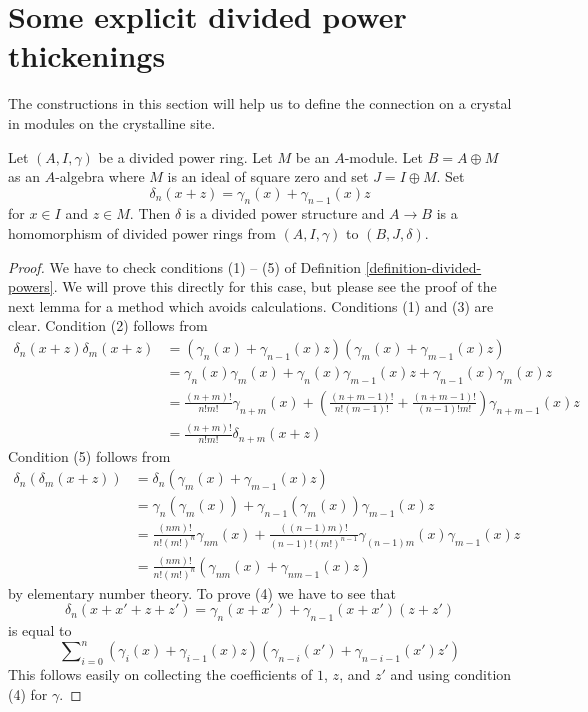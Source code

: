 \section{Some explicit divided power thickenings}
\label{section-explicit-thickenings}

\noindent
The constructions in this section will help us to define the connection
on a crystal in modules on the crystalline site.

\begin{lemma}
\label{lemma-divided-power-first-order-thickening}
Let $(A, I, \gamma)$ be a divided power ring. Let $M$ be an $A$-module.
Let $B = A \oplus M$ as an $A$-algebra where $M$ is an ideal of square zero
and set $J = I \oplus M$. Set
$$
\delta_n(x + z) = \gamma_n(x) + \gamma_{n - 1}(x)z
$$
for $x \in I$ and $z \in M$.
Then $\delta$ is a divided power structure and
$A \to B$ is a homomorphism of divided power rings from
$(A, I, \gamma)$ to $(B, J, \delta)$.
\end{lemma}

\begin{proof}
We have to check conditions (1) -- (5) of
Definition \ref{definition-divided-powers}.
We will prove this directly for this case, but please see the proof of
the next lemma for a method which avoids calculations.
Conditions (1) and (3) are clear. Condition (2) follows from
\begin{align*}
\delta_n(x + z)\delta_m(x + z)
& =
(\gamma_n(x) + \gamma_{n - 1}(x)z)(\gamma_m(x) + \gamma_{m - 1}(x)z) \\
& = \gamma_n(x)\gamma_m(x) + \gamma_n(x)\gamma_{m - 1}(x)z +
\gamma_{n - 1}(x)\gamma_m(x)z \\
& =
\frac{(n + m)!}{n!m!} \gamma_{n + m}(x) +
\left(\frac{(n + m - 1)!}{n!(m - 1)!} +
\frac{(n + m - 1)!}{(n - 1)!m!}\right)
\gamma_{n + m - 1}(x) z \\
& =
\frac{(n + m)!}{n!m!}\delta_{n + m}(x + z)
\end{align*}
Condition (5) follows from
\begin{align*}
\delta_n(\delta_m(x + z))
& =
\delta_n(\gamma_m(x) + \gamma_{m - 1}(x)z) \\
& =
\gamma_n(\gamma_m(x)) + \gamma_{n - 1}(\gamma_m(x))\gamma_{m - 1}(x)z \\
& =
\frac{(nm)!}{n! (m!)^n} \gamma_{nm}(x) +
\frac{((n - 1)m)!}{(n - 1)! (m!)^{n - 1}}
\gamma_{(n - 1)m}(x) \gamma_{m - 1}(x) z \\
& = \frac{(nm)!}{n! (m!)^n}(\gamma_{nm}(x) + \gamma_{nm - 1}(x) z)
\end{align*}
by elementary number theory. To prove (4) we have to see that
$$
\delta_n(x + x' + z + z')
=
\gamma_n(x + x') + \gamma_{n - 1}(x + x')(z + z')
$$
is equal to
$$
\sum\nolimits_{i = 0}^n
(\gamma_i(x) + \gamma_{i - 1}(x)z)
(\gamma_{n - i}(x') + \gamma_{n - i - 1}(x')z')
$$
This follows easily on collecting the coefficients of
$1$, $z$, and $z'$ and using condition (4) for $\gamma$.
\end{proof}

